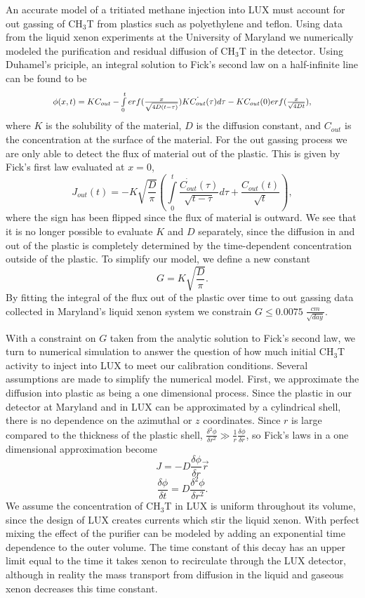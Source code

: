 An accurate model of a tritiated methane injection into LUX must account for out gassing of CH$_3$T from plastics such as polyethylene and teflon.  Using data from the liquid xenon experiments at the University of Maryland we numerically modeled the purification and residual diffusion of CH$_3$T in the detector.  Using Duhamel's priciple, an integral solution to Fick's second law on a half-infinite line can be found to be
\[\Scale[0.85]{\phi (x,t) = KC_{out} - \int \limits_0^t erf(\frac{x}{\sqrt{4D(t - \tau)}})K\dot{C_{out}}(\tau)d\tau - KC_{out}(0)erf(\frac{x}{\sqrt{4Dt}}),}\]
where $K$ is the solubility of the material, $D$ is the diffusion constant, and $C_{out}$ is the concentration at the surface of the material. 
For the out gassing process we are only able to detect the flux of material out of the plastic.  This is given by Fick's first law evaluated at $x=0$,
\[J_{out}(t)= - K \sqrt{\frac{D}{\pi}}\left( \int \limits_0^t \frac{\dot{C_{out}}(\tau)}{\sqrt{t-\tau}} d \tau + \frac{C_{out}(t)}{\sqrt{t}}\right),\]
where the sign has been flipped since the flux of material is outward.  We see that it is no longer possible to evaluate $K$ and $D$ separately, since the diffusion in and out of the plastic is completely determined by the time-dependent concentration outside of the plastic.  To simplify our model, we define a new constant
\[ G = K \sqrt{ \frac{D}{ \pi }} .\]
By fitting the integral of the flux out of the plastic over time to out gassing data collected in Maryland's liquid xenon system we constrain $G \leq 0.0075 \; \frac{cm}{\sqrt{day}}.$ 

With a constraint on $G$ taken from the analytic solution to Fick's second law, we turn to numerical simulation to answer the question of how much initial CH$_3$T activity to inject into LUX to meet our calibration conditions.  Several assumptions are made to simplify the numerical model.  First, we approximate the diffusion into plastic as being a one dimensional process.  Since the plastic in our detector at Maryland and in LUX can be approximated by a cylindrical shell, there is no dependence on the azimuthal or $z$ coordinates.  Since $r$ is large compared to the thickness of the plastic shell, $\frac{\delta^2 \phi}{\delta r^2} \gg \frac{1}{r} \frac {\delta \phi}{\delta r}$, so Fick's laws in a one dimensional approximation become
\[J=-D\frac{\delta \phi}{\delta r}\vec{r}\]
\[\frac{\delta \phi}{\delta t} = D \frac{\delta^2 \phi}{\delta r^2}.\]  We assume the concentration of CH$_3$T in LUX is uniform throughout its volume, since the design of LUX creates currents which stir the liquid xenon.  With perfect mixing the effect of the purifier can be modeled by adding an exponential time dependence to the outer volume.  The time constant of this decay has an upper limit equal to the time it takes xenon to recirculate through the LUX detector, although in reality the mass transport from diffusion in the liquid and gaseous xenon decreases this time constant. 

